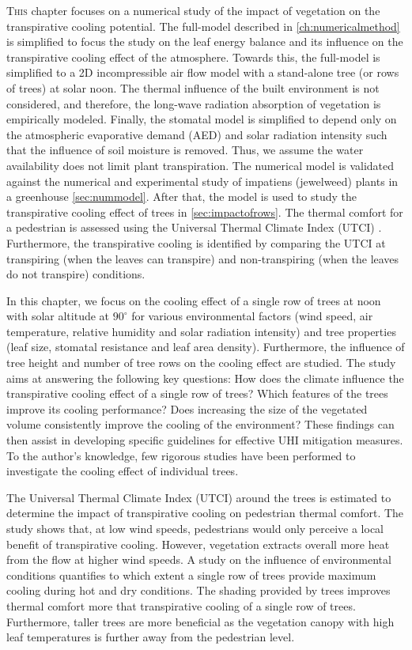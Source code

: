 \lettrine[lines=3,nindent=0em,loversize=0.1]{T}{his} chapter focuses on a numerical study of the impact of vegetation on the transpirative cooling potential. The full-model described in \cref{ch:numericalmethod} is simplified to focus the study on the leaf energy balance and its influence on the transpirative cooling effect of the atmosphere. Towards this, the full-model is simplified to a 2D incompressible air flow model with a stand-alone tree (or rows of trees) at solar noon. The thermal influence of the built environment is not considered, and therefore, the long-wave radiation absorption of vegetation is empirically modeled. Finally, the stomatal model is simplified to depend only on the atmospheric evaporative demand (AED) and solar radiation intensity such that the influence of soil moisture is removed. Thus, we assume the water availability does not limit plant transpiration. The numerical model is validated against the numerical and experimental study of impatiens (jewelweed) plants in a greenhouse \cref{sec:nummodel}. After that, the model is used to study the transpirative cooling effect of trees in \cref{sec:impactofrows}. The thermal comfort for a pedestrian is assessed using the Universal Thermal Climate Index (UTCI) \citep{Fiala2001}. Furthermore, the transpirative cooling is identified by comparing the UTCI at transpiring (when the leaves can transpire) and non-transpiring (when the leaves do not transpire) conditions.

In this chapter, we focus on the cooling effect of a single row of trees at noon with solar altitude at $90^{\circ}$ for various environmental factors (wind speed, air temperature, relative humidity and solar radiation intensity) and tree properties (leaf size, stomatal resistance and leaf area density). Furthermore, the influence of tree height and number of tree rows on the cooling effect are studied. The study aims at answering the following key questions: How does the climate influence the transpirative cooling effect of a single row of trees? Which features of the trees improve its cooling performance? Does increasing the size of the vegetated volume consistently improve the cooling of the environment? These findings can then assist in developing specific guidelines for effective UHI mitigation measures. To the author’s knowledge, few rigorous studies have been performed to investigate the cooling effect of individual trees. 

The Universal Thermal Climate Index (UTCI) around the trees is estimated to determine the impact of transpirative cooling on pedestrian thermal comfort. The study shows that, at low wind speeds, pedestrians would only perceive a local benefit of transpirative cooling. However, vegetation extracts overall more heat from the flow at higher wind speeds. A study on the influence of environmental conditions quantifies to which extent a single row of trees provide maximum cooling during hot and dry conditions. The shading provided by trees improves thermal comfort more that transpirative cooling of a single row of trees. Furthermore, taller trees are more beneficial as the vegetation canopy with high leaf temperatures is further away from the pedestrian level.

